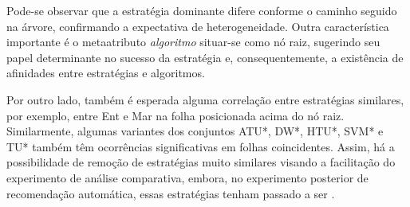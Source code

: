Pode-se observar que a estratégia dominante difere conforme o caminho seguido na árvore,
confirmando a expectativa de heterogeneidade.
Outra característica importante é o metaatributo \textit{algoritmo} situar-se como nó raiz,
sugerindo seu papel determinante no sucesso da estratégia e,
consequentemente, a existência de afinidades entre estratégias e algoritmos.

Por outro lado,
também é esperada alguma correlação entre estratégias similares, por exemplo,
entre Ent e Mar na folha posicionada acima do nó raiz.
Similarmente, algumas variantes dos conjuntos ATU*, DW*, HTU*, SVM* e TU*
também têm ocorrências significativas em folhas coincidentes.
Assim, há a possibilidade de remoção de estratégias muito similares
visando a facilitação do experimento de análise comparativa,
embora, no experimento posterior de  recomendação
automática, essas estratégias tenham passado a ser .

